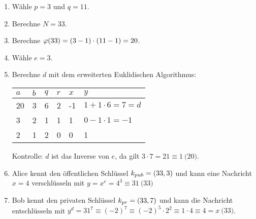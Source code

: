 \begin{example}\mbox{}
  \begin{enumerate}
    \item Wähle $p = 3$ und $q = 11$.
    \item Berechne $N = 33$.
    \item Berechne $\varphi(33) = (3 - 1) \cdot (11 - 1) = 20$.
    \item Wähle $e = 3$.
    \item Berechne $d$ mit dem erweiterten Euklidischen Algorithmus:
          \begin{center}
            \begin{tabular}{|l|l|l|l|l|l|}
              \hline
              $a$ & $b$ & $q$ & $r$ & $x$ & $y$                     \\ \hline
              20  & 3   & 6   & 2   & -1  & $1 + 1 \cdot 6 = 7 = d$ \\ \hline
              3   & 2   & 1   & 1   & 1   & $0 - 1 \cdot 1 = -1$    \\ \hline
              2   & 1   & 2   & 0   & 0   & 1                       \\ \hline
            \end{tabular}
          \end{center}
          Kontrolle: $d$ ist das Inverse von $e$, da gilt $3 \cdot 7 = 21 \equiv 1 \pod{20}$.
    \item Alice kennt den öffentlichen Schlüssel $k_{pub} = (33,3)$ und kann eine
          Nachricht $x = 4$ verschlüsseln mit $y = x^e = 4^3 \equiv 31 \pod{33}$
    \item Bob kennt den privaten Schlüssel $k_{pr} = (33,7)$ und kann die Nachricht
          entschlüsseln mit $y^d = 31^7 \equiv (-2)^7 \equiv (-2)^5 \cdot 2^2 \equiv
            1 \cdot 4 \equiv 4 = x \pod{33}$.
  \end{enumerate}
\end{example}
